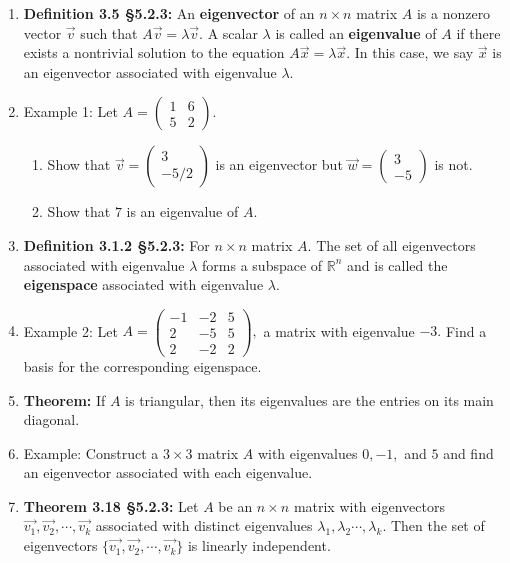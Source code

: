 \documentclass[11pt,fleqn]{article}
\begin{document}
\renewcommand{\headrulewidth}{0pt}
\newcommand{\blank}[1]{\rule{#1}{0.75pt}}
\renewcommand{\d}{\displaystyle}

\newcommand{\bpm}{\begin{pmatrix}}
\newcommand{\epm}{\end{pmatrix}}
\newcommand{\bbm}{\begin{bmatrix}}
\newcommand{\ebm}{\end{bmatrix}}

\vspace*{-0.7in}

\begin{center}
  \large {} \end{center}
 \begin{enumerate}
 \item \textbf{Definition 3.5 \S 5.2.3:} An \textbf{eigenvector} of an $n \times n$ matrix $A$ is a nonzero vector $\vec{v}$ such that $A \vec{v}=\lambda \vec{v}.$ A scalar $\lambda$ is called an \textbf{eigenvalue} of $A$ if there exists a nontrivial solution to the equation $A \vec{x}=\lambda \vec{x}.$ In this case, we say $\vec{x}$ is an eigenvector associated with eigenvalue $\lambda.$
 
 \item Example 1: Let $A=\bpm 1&6\\5&2 \epm.$ 
 	\begin{enumerate}
	\item Show that $\vec{v}=\bpm 3\\-5/2 \epm$ is an eigenvector but $\vec{w}=\bpm 3\\-5 \epm$ is not.
	\vfill
	\item Show that $7$ is an eigenvalue of $A.$
	\vfill
	\end{enumerate}
\item  \textbf{Definition 3.1.2 \S5.2.3:} For $n \times n$ matrix $A.$ The set of all eigenvectors associated with eigenvalue $\lambda$ forms a subspace of $\mathbb{R}^n$ and is called the \textbf{eigenspace} associated with eigenvalue $\lambda.$\\
\item Example 2: Let $A=\bpm -1&-2&5\\2&-5&5\\2&-2&2\epm,$ a matrix with eigenvalue $-3.$ Find a basis for the corresponding eigenspace.
\vfill
\newpage
\item \textbf{Theorem:} If $A$ is triangular, then its eigenvalues are the entries on its main diagonal.
\item Example: Construct a $3 \times 3$ matrix $A$ with eigenvalues $0, -1,$ and $5$ and find an eigenvector associated with each eigenvalue.
\vfill
\item \textbf{Theorem 3.18 \S 5.2.3:} Let $A$ be an $n \times n$ matrix with eigenvectors $\vec{v_1},\vec{v_2}, \cdots, \vec{v_k}$  associated with distinct eigenvalues $\lambda_1, \lambda_2\cdots,\lambda_k.$ Then the set  of eigenvectors $\{ \vec{v_1},\vec{v_2}, \cdots, \vec{v_k}\}$ is  linearly independent.


\end{enumerate}
\end{document}
